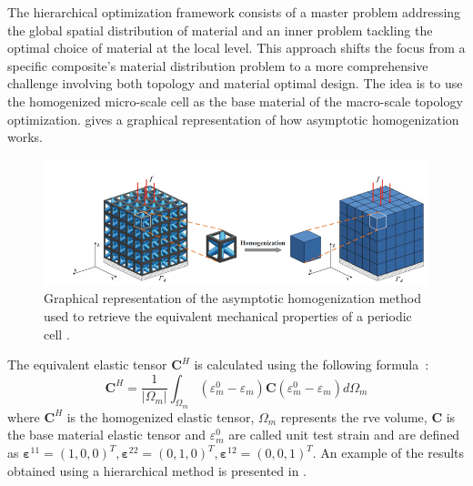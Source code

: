 The hierarchical optimization framework consists of a master problem addressing the global spatial distribution of material and an inner problem tackling the optimal choice of material at the local level. This approach shifts the focus from a specific composite's material distribution problem to a more comprehensive challenge involving both topology and material optimal design. The idea is to use the homogenized micro-scale cell as the base material of the macro-scale topology optimization.  gives a graphical representation of how asymptotic homogenization works.
\begin{figure}
    \centering
    \includegraphics[width=\linewidth]{figures/02_literature/homo.png}
    \caption{Graphical representation of the asymptotic homogenization method used to retrieve the equivalent mechanical properties of a periodic cell \cite{wang_concurrent_2020}.}
    \label{fig:02_homogen}
\end{figure}
The equivalent elastic tensor $\mathbf{C}^{H}$ is calculated using the following formula~:
\begin{equation}
    \mathbf{C}^{H}=\frac{1}{\left|\Omega_{m}\right|} \int_{\Omega_{m}} \left(\varepsilon_{m}^{0}-\varepsilon_{m}\right)\mathbf{C}\left(\varepsilon_{m}^{0}-\varepsilon_{m}\right) d \Omega_{m}
\end{equation}
where $\mathbf{C}^{H}$ is the homogenized elastic tensor, $\Omega_{m}$ represents the \gls{rve} volume, $\mathbf{C}$ is the base material elastic tensor and $\varepsilon_{m}^{0}$ are called unit test strain and are defined as $\boldsymbol{\varepsilon}^{11}=(1,0,0)^{T}, \boldsymbol{\varepsilon}^{22}=(0,1,0)^{T}, \boldsymbol{\varepsilon}^{12}=(0,0,1)^{T}$. An example of the results obtained using a hierarchical method is presented in .
